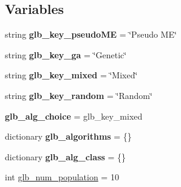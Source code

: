 \subsection*{Variables}
\begin{DoxyCompactItemize}
\item 
\hypertarget{namespacesrc_1_1macroevolve_a2c1b560c5d8119f3eaeff8ee36454405}{
string {\bfseries glb\_\-key\_\-pseudoME} = \char`\"{}Pseudo ME\char`\"{}}
\label{namespacesrc_1_1macroevolve_a2c1b560c5d8119f3eaeff8ee36454405}

\item 
\hypertarget{namespacesrc_1_1macroevolve_a5e31f5c06ae242bd24d23ba94d31ed3f}{
string {\bfseries glb\_\-key\_\-ga} = \char`\"{}Genetic\char`\"{}}
\label{namespacesrc_1_1macroevolve_a5e31f5c06ae242bd24d23ba94d31ed3f}

\item 
\hypertarget{namespacesrc_1_1macroevolve_ac8d8ef02c80d0e19df07e9d7a230eb92}{
string {\bfseries glb\_\-key\_\-mixed} = \char`\"{}Mixed\char`\"{}}
\label{namespacesrc_1_1macroevolve_ac8d8ef02c80d0e19df07e9d7a230eb92}

\item 
\hypertarget{namespacesrc_1_1macroevolve_a15393607f52e266154482d40a2d08018}{
string {\bfseries glb\_\-key\_\-random} = \char`\"{}Random\char`\"{}}
\label{namespacesrc_1_1macroevolve_a15393607f52e266154482d40a2d08018}

\item 
\hypertarget{namespacesrc_1_1macroevolve_a7d6fa3dfdfd1b34bfcfba6a5bb75a38e}{
{\bfseries glb\_\-alg\_\-choice} = glb\_\-key\_\-mixed}
\label{namespacesrc_1_1macroevolve_a7d6fa3dfdfd1b34bfcfba6a5bb75a38e}

\item 
\hypertarget{namespacesrc_1_1macroevolve_ad4b573f62b3b5cd60e3db501d8059f4b}{
dictionary {\bfseries glb\_\-algorithms} = \{\}}
\label{namespacesrc_1_1macroevolve_ad4b573f62b3b5cd60e3db501d8059f4b}

\item 
\hypertarget{namespacesrc_1_1macroevolve_a903173accd313485b6ce790d888a65b8}{
dictionary {\bfseries glb\_\-alg\_\-class} = \{\}}
\label{namespacesrc_1_1macroevolve_a903173accd313485b6ce790d888a65b8}

\item 
\hypertarget{namespacesrc_1_1macroevolve_a23a97f8a15900779302a7c97bb4f8b6c}{
int \hyperlink{namespacesrc_1_1macroevolve_a23a97f8a15900779302a7c97bb4f8b6c}{glb\_\-num\_\-population} = 10}
\label{namespacesrc_1_1macroevolve_a23a97f8a15900779302a7c97bb4f8b6c}


\end{DoxyCompactItemize}
